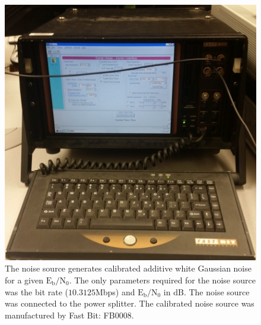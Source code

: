 \begin{figure}
	\centering\includegraphics[scale=0.5]{figures/eq_GPUimplementation/noise.jpg}
	\caption{The noise source generates calibrated additive white Gaussian noise for a given $\text{E}_\text{b}/\text{N}_\text{0}$. The only parameters required for the noise source was the bit rate ($10.3125$Mbps) and $\text{E}_\text{b}/\text{N}_\text{0}$ in dB. The noise source was connected to the power splitter. The calibrated noise source was manufactured by Fast Bit: FB0008.}
	\label{fig:noise}
\end{figure}
